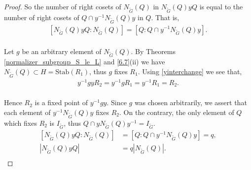 \begin{proof}
So the number of right cosets of $N_{\widetilde{G}}(Q)$ in $N_{\widetilde{G}}(Q) y Q$ is equal to the number of right cosets of $Q \cap y^{-1} N_{\widetilde{G}}(Q) y$ in $Q$. That is,
\vspace{2mm}
\begin{align}\label{doublecoset} [N_{\widetilde{G}}(Q) y Q : N_{\widetilde{G}}(Q)] = [Q : Q \cap y^{-1} N_{\widetilde{G}}(Q) y]. \\ \nonumber
\end{align}

Let $g$ be an arbitrary element of $N_{\widetilde{G}}(Q)$. By Theorems \ref{normalizer_subgroup_S_le_L} and \ref{6.7}(ii) we have $N_{\widetilde{G}}(Q) \subset H = \text{Stab}(R_1)$, thus $g$ fixes $R_1$. Using \eqref{yinterchange} we see that,
\vspace{2mm}
\begin{align*} y^{-1} g y R_2 = y^{-1} g R_1 = y^{-1} R_1 = R_2. \\
\end{align*}

Hence $R_2$ is a fixed point of $y^{-1} g y$. Since $g$ was chosen arbitrarily, we assert that each element of $y^{-1} N_{\widetilde{G}}(Q) y$ fixes $R_2$. On the contrary, the only element of $Q$ which fixes $R_2$ is $I_{\widetilde{G}}$, thus $Q \cap y N_{\widetilde{G}}(Q) y^{-1} = I_{\widetilde{G}}$.
\vspace{2mm}
\begin{align}\label{qwed} [N_{\widetilde{G}}(Q) y Q : N_{\widetilde{G}}(Q)] &= [Q : Q \cap y^{-1} N_{\widetilde{G}}(Q) y] = q, \nonumber
\\[1ex] |N_{\widetilde{G}}(Q) y Q| &= q|N_{\widetilde{G}}(Q)|. \\ \nonumber
\end{align}


\end{proof}
